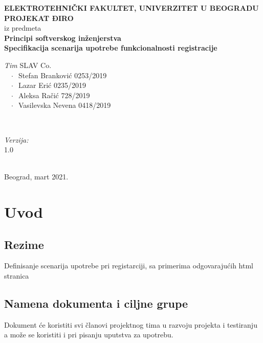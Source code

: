 \documentclass[12pt]{article}
\begin{document}
    \renewcommand{\labelenumii}{\arabic{enumi}.\arabic{enumii}}
	\begin{titlepage}  
		\center
		\textbf{ \LARGE ELEKTROTEHNIČKI FAKULTET, UNIVERZITET U BEOGRADU } \\[4cm]
		\textbf{ \Large PROJEKAT ĐIRO\texttrademark} \\[0.3cm]
		iz predmeta \\[0.3cm]
		\textbf{ \Large Principi softverskog inženjerstva} \\[0.7cm]
		{ \huge \bfseries Specifikacija scenarija upotrebe funkcionalnosti registracije } \\[6cm]
		

		\begin{minipage}{0.5\textwidth}
			\begin{flushleft}
				\large
				\emph{Tim} SLAV Co. \\
			     $\;\;\; \cdot \;\;$Stefan Branković  0253/2019\\
			     $\;\;\; \cdot \;\;$Lazar Erić 0235/2019\\
			     $\;\;\; \cdot \;\;$Aleksa Račić 728/2019\\
			     $\;\;\; \cdot \;\;$Vasilevska Nevena 0418/2019
			\end{flushleft}
		\end{minipage}
		~
		\begin{minipage}{0.4\textwidth}
			\begin{flushright}
				\large
				\emph{Verzija:} \\
				1.0
			\end{flushright}
		\end{minipage} \\[2cm]
		\enlargethispage{4\baselineskip}
		{ \large Beograd, mart 2021. }
		\vfill
	\end{titlepage}
\pagebreak
\tableofcontents
\pagebreak



\section{Uvod}
\subsection{Rezime}
Definisanje scenarija upotrebe pri registarciji, sa primerima odgovarajućih html stranica
\subsection{Namena dokumenta i ciljne grupe}
Dokument će koristiti svi članovi projektnog tima u razvoju projekta i testiranju a može se koristiti i pri pisanju uputstva za
upotrebu.
\end{document}

